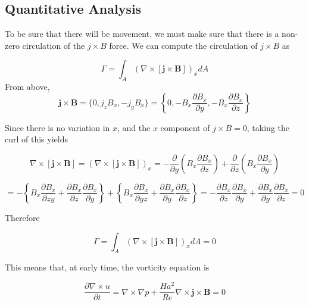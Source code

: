 \documentclass[11pt]{article}
\begin{document}
\subsection{Quantitative Analysis}
To be sure that there will be movement, we must make sure that there is a non-zero circulation of the $j \times B$ force. We can compute the circulation of $j \times B$ as 

\begin{equation}
	\Gamma = \int_A ( \nabla \times [\pmb{j} \times \pmb{B}] )_x dA
\end{equation}
From above,
\begin{equation}
	\pmb{j} \times \pmb{B}
	=
	\{
	0 ,
	j_z B_x ,
	-j_y B_x
	\}
	=
	\left\{
	0 ,
	- B_x \frac{\partial B_x}{\partial y} ,
	- B_x \frac{\partial B_x}{\partial z}
	\right\}
\end{equation}


Since there is no variation in $x$, and the $x$ component of $j \times B=0$, taking the curl of this yields

\begin{equation}
	\nabla \times [\pmb{j} \times \pmb{B}]
	=
	(\nabla \times [\pmb{j} \times \pmb{B}]) _x
	=
	-
	\frac{\partial}{\partial y} \left( B_x \frac{\partial B_x}{\partial z} \right)
	+
	\frac{\partial}{\partial z} \left( B_x \frac{\partial B_x}{\partial y} \right)
\end{equation}

\begin{equation}
	=
	-
	\left\{
	B_x \frac{\partial B_x}{\partial z y} + \frac{\partial B_x}{\partial z} \frac{\partial B_x}{\partial y}
	\right\}
	+
	\left\{
	B_x \frac{\partial B_x}{\partial y z} + \frac{\partial B_x}{\partial y} \frac{\partial B_x}{\partial z}
	\right\}
	=
	-
	\frac{\partial B_x}{\partial z} \frac{\partial B_x}{\partial y}
	+
	\frac{\partial B_x}{\partial y} \frac{\partial B_x}{\partial z}
	= 0
\end{equation}

Therefore 

\begin{equation}
	\Gamma = \int_A ( \nabla \times [\pmb{j} \times \pmb{B}] )_x dA = 0
\end{equation}


This means that, at early time, the vorticity equation is 

\begin{equation}
	\frac{\partial \nabla \times u}{\partial t} = \nabla \times \nabla p
	+
	\frac{Ha^2}{Re}
	\nabla \times 
	\pmb{j}\times \pmb{B}
	=
	0
\end{equation}
\end{document}
